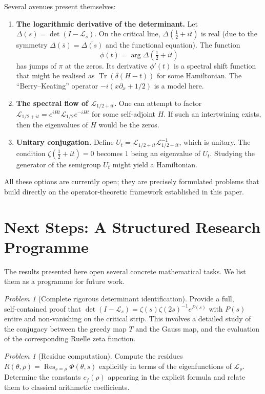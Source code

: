 \documentclass[11pt,a4paper]{article}
\theoremstyle{remark}
\newtheorem{problem}[theorem]{Problem}
\begin{document}
Several avenues present themselves:
\begin{enumerate}[label=(\alph*)]
    \item \textbf{The logarithmic derivative of the determinant.} Let \(\Delta(s)=\det(I-\mathcal{L}_s)\). On the critical line, \(\Delta(\tfrac12+it)\) is real (due to the symmetry \(\Delta(\overline{s})=\overline{\Delta(s)}\) and the functional equation). The function
    \[
    \phi(t)=\arg\Delta(\tfrac12+it)
    \]
    has jumps of \(\pi\) at the zeros. Its derivative \(\phi'(t)\) is a spectral shift function that might be realised as \(\operatorname{Tr}(\delta(H-t))\) for some Hamiltonian. The “Berry–Keating” operator \(-i(x\partial_x+1/2)\) is a model here.
    \item \textbf{The spectral flow of \(\mathcal{L}_{1/2+it}\).} One can attempt to factor \(\mathcal{L}_{1/2+it}=e^{iH t} \mathcal{L}_{1/2} e^{-iH t}\) for some self‑adjoint \(H\). If such an intertwining exists, then the eigenvalues of \(H\) would be the zeros.
    \item \textbf{Unitary conjugation.} Define \(U_t=\mathcal{L}_{1/2+it}\mathcal{L}_{1/2-it}^{-1}\), which is unitary. The condition \(\zeta(\tfrac12+it)=0\) becomes \(1\) being an eigenvalue of \(U_t\). Studying the generator of the semigroup \(U_t\) might yield a Hamiltonian.
\end{enumerate}
All these options are currently open; they are precisely formulated problems that build directly on the operator‑theoretic framework established in this paper.

\section{Next Steps: A Structured Research Programme}

The results presented here open several concrete mathematical tasks. We list them as a programme for future work.

\begin{problem}[Complete rigorous determinant identification]\label{prob:det}
Provide a full, self‑contained proof that \(\det(I-\mathcal{L}_s)=\zeta(s)\zeta(2s)^{-1}e^{P(s)}\) with \(P(s)\) entire and non‑vanishing on the critical strip. This involves a detailed study of the conjugacy between the greedy map \(T\) and the Gauss map, and the evaluation of the corresponding Ruelle zeta function.
\end{problem}

\begin{problem}[Residue computation]\label{prob:residues}
Compute the residues \(R(\theta,\rho)=\operatorname{Res}_{s=\rho}\Phi(\theta,s)\) explicitly in terms of the eigenfunctions of \(\mathcal{L}_\rho\). Determine the constants \(c_f(\rho)\) appearing in the explicit formula and relate them to classical arithmetic coefficients.
\end{problem}
\end{document}
